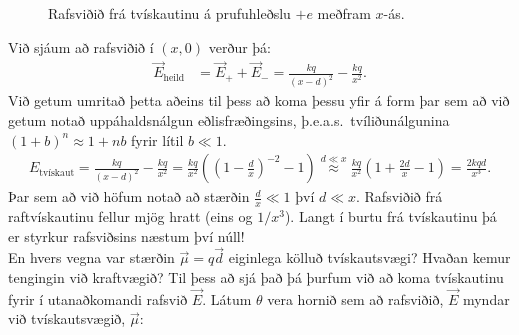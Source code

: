 \ifdefined \wholebook \else\documentclass[oneside]{book}\usepackage{EdlBook}\graphicspath{{figures/}}
\begin{document}
\begin{figure}[H]
    \centering
{}
    \caption{Rafsviðið frá tvískautinu á prufuhleðslu $+e$ meðfram $x$-ás.}
\end{figure}
Við sjáum að rafsviðið í $(x,0)$ verður þá:
\begin{align*}
    \vec{E}_{\text{heild}} &= \vec{E}_+ + \vec{E}_- = \frac{kq}{(x-d)^2} - \frac{kq}{x^2}.
\end{align*}
Við getum umritað þetta aðeins til þess að koma þessu yfir á form þar sem að við getum notað uppáhaldsnálgun eðlisfræðingsins, þ.e.a.s.~tvíliðunálgunina $(1+b)^n \approx 1 + nb$ fyrir lítil $b \ll 1$.
\begin{align*}
    E_{\text{tvískaut}} = \frac{kq}{(x-d)^2} - \frac{kq}{x^2} = \frac{kq}{x^2}\left( \left(1 - \frac{d}{x} \right)^{-2} - 1 \right) \stackrel{d \ll x}{\approx} \frac{kq}{x^2}\left( 1 + \frac{2d}{x} - 1 \right) = \frac{2kqd}{x^3}.
\end{align*}
Þar sem að við höfum notað að stærðin $\frac{d}{x} \ll 1$ því $d \ll x$. Rafsviðið frá raftvískautinu fellur mjög hratt (eins og $1/x^3$). Langt í burtu frá tvískautinu þá er styrkur rafsviðsins næstum því núll! \\

En hvers vegna var stærðin $\vec{\mu} = q \vec{d}$ eiginlega kölluð tvískautsvægi? Hvaðan kemur tengingin við kraftvægið? Til þess að sjá það þá þurfum við að koma tvískautinu fyrir í utanaðkomandi rafsvið $\vec{E}$. Látum $\theta$ vera hornið sem að rafsviðið, $\vec{E}$ myndar við tvískautsvægið, $\vec{\mu}$:
\end{document}
